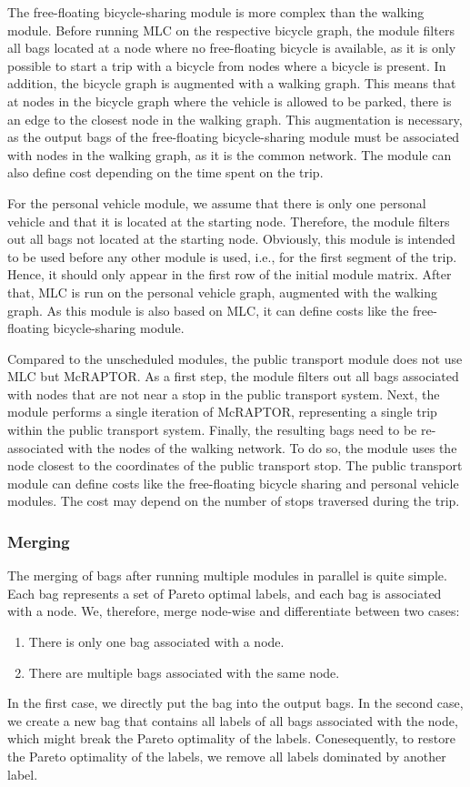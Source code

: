 The free-floating bicycle-sharing module is more complex than the walking module.
Before running MLC on the respective bicycle graph, the module filters all bags located at a node where no free-floating bicycle is available, as it is only possible to start a trip with a bicycle from nodes where a bicycle is present.
In addition, the bicycle graph is augmented with a walking graph. 
This means that at nodes in the bicycle graph where the vehicle is allowed to be parked, there is an edge to the closest node in the walking graph.
This augmentation is necessary, as the output bags of the free-floating bicycle-sharing module must be associated with nodes in the walking graph, as it is the common network.
The module can also define cost depending on the time spent on the trip.

For the personal vehicle module, we assume that there is only one personal vehicle and that it is located at the starting node.
Therefore, the module filters out all bags not located at the starting node.
Obviously, this module is intended to be used before any other module is used, i.e., for the first segment of the trip.
Hence, it should only appear in the first row of the initial module matrix.
After that, MLC is run on the personal vehicle graph, augmented with the walking graph.
As this module is also based on MLC, it can define costs like the free-floating bicycle-sharing module.

Compared to the unscheduled modules, the public transport module does not use MLC but McRAPTOR.
As a first step, the module filters out all bags associated with nodes that are not near a stop in the public transport system.
Next, the module performs a single iteration of McRAPTOR, representing a single trip within the public transport system.
Finally, the resulting bags need to be re-associated with the nodes of the walking network.
To do so, the module uses the node closest to the coordinates of the public transport stop.
The public transport module can define costs like the free-floating bicycle sharing and personal vehicle modules.
The cost may depend on the number of stops traversed during the trip.

\subsubsection{Merging}
\label{subsubsec:merging}

The merging of bags after running multiple modules in parallel is quite simple.
Each bag represents a set of Pareto optimal labels, and each bag is associated with a node.
We, therefore, merge node-wise and differentiate between two cases:
\begin{enumerate}
    \item There is only one bag associated with a node.
    \item There are multiple bags associated with the same node.
\end{enumerate}
In the first case, we directly put the bag into the output bags.
In the second case, we create a new bag that contains all labels of all bags associated with the node, which might break the Pareto optimality of the labels.
Conesequently, to restore the Pareto optimality of the labels, we remove all labels dominated by another label.

